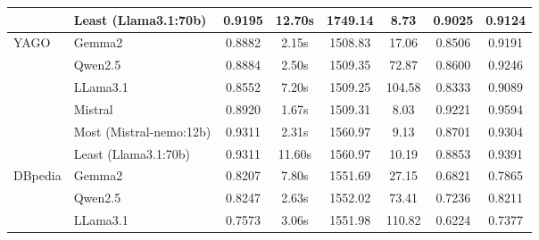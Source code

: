 \begin{table}[ht!]
{\begin{threeparttable}
\begin{tabular}{llcccc||cc}
                                            & Least (Llama3.1:70b)               & 0.9195                         & 12.70s                           & 1749.14                                       & 8.73             & 0.9025    & 0.9124   \\ \hline \hline
                \multirow{6}{*}{YAGO}       & Gemma2                             & 0.8882                         & 2.15s                            & 1508.83                                       & 17.06            & 0.8506    & 0.9191   \\
                                            & Qwen2.5                            & 0.8884                         & 2.50s                            & 1509.35                                       & 72.87            & 0.8600    & 0.9246   \\
                                            & LLama3.1                           & 0.8552                         & 7.20s                            & 1509.25                                       & 104.58           & 0.8333    & 0.9089   \\
                                            & Mistral                            & 0.8920                         & 1.67s                            & 1509.31                                       & 8.03             & 0.9221    & 0.9594   \\ \cline{2-8}
                                            & Most (Mistral-nemo:12b)            & 0.9311                         & 2.31s                            & 1560.97                                       & 9.13             & 0.8701    & 0.9304   \\
                                            & Least (Llama3.1:70b)               & 0.9311                         & 11.60s                           & 1560.97                                       & 10.19            & 0.8853    & 0.9391   \\ \hline \hline
                \multirow{6}{*}{DBpedia}    & Gemma2                             & 0.8207                         & 7.80s                            & 1551.69                                       & 27.15            & 0.6821    & 0.7865   \\
                                            & Qwen2.5                            & 0.8247                         & 2.63s                            & 1552.02                                       & 73.41            & 0.7236    & 0.8211   \\
                                            & LLama3.1                           & 0.7573                         & 3.06s                            & 1551.98                                       & 110.82           & 0.6224    & 0.7377   \\

\end{tabular}
\end{threeparttable}}
\end{table}
